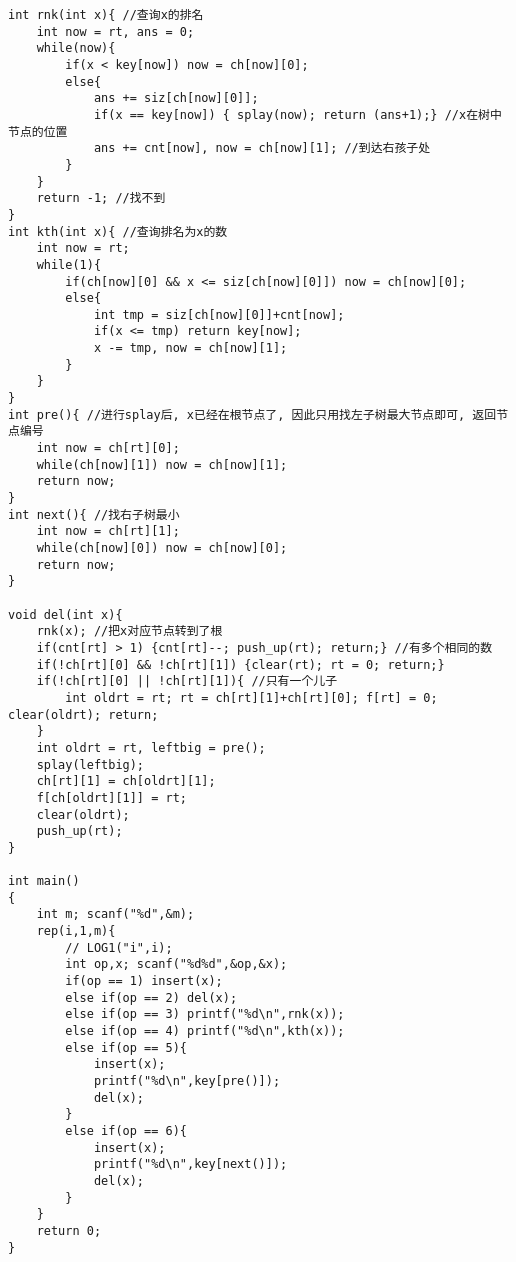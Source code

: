 \documentclass[twoside]{article}
\begin{document}
\begin{lstlisting}
int rnk(int x){ //查询x的排名
	int now = rt, ans = 0;
	while(now){
		if(x < key[now]) now = ch[now][0];
		else{
			ans += siz[ch[now][0]];
			if(x == key[now]) { splay(now); return (ans+1);} //x在树中节点的位置
			ans += cnt[now], now = ch[now][1]; //到达右孩子处
		}
	}
	return -1; //找不到
}
int kth(int x){ //查询排名为x的数
	int now = rt;
	while(1){
		if(ch[now][0] && x <= siz[ch[now][0]]) now = ch[now][0];
		else{
			int tmp = siz[ch[now][0]]+cnt[now];
			if(x <= tmp) return key[now];
			x -= tmp, now = ch[now][1];
		}
	}
}
int pre(){ //进行splay后, x已经在根节点了, 因此只用找左子树最大节点即可, 返回节点编号
	int now = ch[rt][0];
	while(ch[now][1]) now = ch[now][1];
	return now;
}
int next(){ //找右子树最小
	int now = ch[rt][1];
	while(ch[now][0]) now = ch[now][0];
	return now;
}

void del(int x){
	rnk(x); //把x对应节点转到了根
	if(cnt[rt] > 1) {cnt[rt]--; push_up(rt); return;} //有多个相同的数
	if(!ch[rt][0] && !ch[rt][1]) {clear(rt); rt = 0; return;}
	if(!ch[rt][0] || !ch[rt][1]){ //只有一个儿子
		int oldrt = rt; rt = ch[rt][1]+ch[rt][0]; f[rt] = 0; clear(oldrt); return;
	}
	int oldrt = rt, leftbig = pre();
	splay(leftbig);
	ch[rt][1] = ch[oldrt][1];
	f[ch[oldrt][1]] = rt;
	clear(oldrt);
	push_up(rt);
}

int main()
{
    int m; scanf("%d",&m);
	rep(i,1,m){
		// LOG1("i",i);
		int op,x; scanf("%d%d",&op,&x);
		if(op == 1) insert(x);
		else if(op == 2) del(x);
		else if(op == 3) printf("%d\n",rnk(x));
		else if(op == 4) printf("%d\n",kth(x));
		else if(op == 5){
			insert(x);
			printf("%d\n",key[pre()]);
			del(x);
		}
		else if(op == 6){
			insert(x);
			printf("%d\n",key[next()]);	
			del(x);
		}
	}
	return 0;
}\end{lstlisting}
\end{document}
